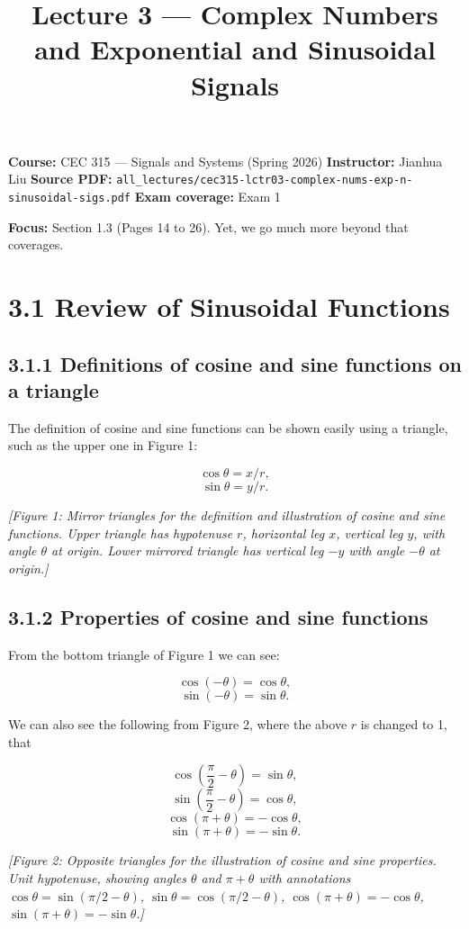 \documentclass[11pt]{article}
\title{Lecture 3 — Complex Numbers and Exponential and Sinusoidal Signals}
\author{}
\date{}
\begin{document}
\maketitle

\textbf{Course:} CEC 315 — Signals and Systems (Spring 2026)
\textbf{Instructor:} Jianhua Liu
\textbf{Source PDF:} \texttt{all\_lectures/cec315-lctr03-complex-nums-exp-n-sinusoidal-sigs.pdf}
\textbf{Exam coverage:} Exam 1

\textbf{Focus:} Section 1.3 (Pages 14 to 26). Yet, we go much more beyond that coverages.

\section*{3.1 Review of Sinusoidal Functions}

\subsection*{3.1.1 Definitions of cosine and sine functions on a triangle}

The definition of cosine and sine functions can be shown easily using a triangle, such as the upper one in Figure 1:

\[\cos\theta = x/r,\]
\[\sin\theta = y/r.\]

\textit{[Figure 1: Mirror triangles for the definition and illustration of cosine and sine functions. Upper triangle has hypotenuse $r$, horizontal leg $x$, vertical leg $y$, with angle $\theta$ at origin. Lower mirrored triangle has vertical leg $-y$ with angle $-\theta$ at origin.]}

\subsection*{3.1.2 Properties of cosine and sine functions}

From the bottom triangle of Figure 1 we can see:

\[\cos(-\theta) = \cos\theta,\]
\[\sin(-\theta) = \sin\theta.\]

We can also see the following from Figure 2, where the above $r$ is changed to 1, that

\[\cos\left(\frac{\pi}{2} - \theta\right) = \sin\theta,\]
\[\sin\left(\frac{\pi}{2} - \theta\right) = \cos\theta,\]
\[\cos(\pi + \theta) = -\cos\theta,\]
\[\sin(\pi + \theta) = -\sin\theta.\]

\textit{[Figure 2: Opposite triangles for the illustration of cosine and sine properties. Unit hypotenuse, showing angles $\theta$ and $\pi+\theta$ with annotations $\cos\theta = \sin(\pi/2 - \theta)$, $\sin\theta = \cos(\pi/2 - \theta)$, $\cos(\pi+\theta) = -\cos\theta$, $\sin(\pi+\theta) = -\sin\theta$.]}
\end{document}
